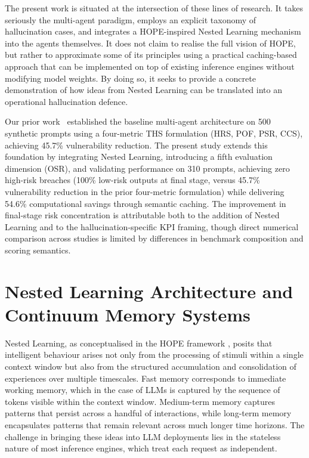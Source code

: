 \documentclass[11pt,a4paper]{article}
\begin{document}
	The present work is situated at the intersection of these lines of research. It takes seriously the multi-agent paradigm, employs an explicit taxonomy of hallucination cases, and integrates a HOPE-inspired Nested Learning mechanism into the agents themselves. It does not claim to realise the full vision of HOPE, but rather to approximate some of its principles using a practical caching-based approach that can be implemented on top of existing inference engines without modifying model weights. By doing so, it seeks to provide a concrete demonstration of how ideas from Nested Learning can be translated into an operational hallucination defence.
	
	Our prior work~\cite{gosmar2025promptinjection} established the baseline multi-agent architecture on 500 synthetic prompts using a four-metric THS formulation (HRS, POF, PSR, CCS), achieving 45.7\% vulnerability reduction. The present study extends this foundation by integrating Nested Learning, introducing a fifth evaluation dimension (OSR), and validating performance on 310 prompts, achieving zero high-risk breaches (100\% low-risk outputs at final stage, versus 45.7\% vulnerability reduction in the prior four-metric formulation) while delivering 54.6\% computational savings through semantic caching. The improvement in final-stage risk concentration is attributable both to the addition of Nested Learning and to the hallucination-specific KPI framing, though direct numerical comparison across studies is limited by differences in benchmark composition and scoring semantics.
	
	\section{Nested Learning Architecture and Continuum Memory Systems}
	\label{sec:nested}
	
	Nested Learning, as conceptualised in the HOPE framework \cite{behrouz2025nested}, posits that intelligent behaviour arises not only from the processing of stimuli within a single context window but also from the structured accumulation and consolidation of experiences over multiple timescales. Fast memory corresponds to immediate working memory, which in the case of LLMs is captured by the sequence of tokens visible within the context window. Medium-term memory captures patterns that persist across a handful of interactions, while long-term memory encapsulates patterns that remain relevant across much longer time horizons. The challenge in bringing these ideas into LLM deployments lies in the stateless nature of most inference engines, which treat each request as independent.
	
\end{document}
